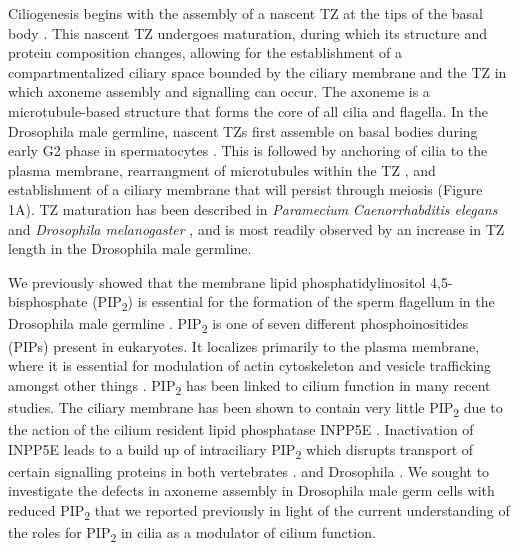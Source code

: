 \documentclass[12pt, twoside, letterpaper]{article}
\newcommand{\PIP}{PIP\textsubscript{2}}
\begin{document}
\begin{doublespacing}
\begin{linenumbers}
    Ciliogenesis begins with the assembly of a nascent TZ at the tips of
    the basal body \citep{reiter2012base}.
    This nascent TZ undergoes maturation, during which its structure and protein
    composition changes, allowing for the
    establishment of a compartmentalized ciliary space bounded by the ciliary membrane
    and the TZ in which axoneme assembly and signalling can occur.
    The axoneme is a microtubule-based structure that forms the core of all cilia and flagella.
    In the Drosophila male germline, nascent TZs first assemble on basal bodies
    during early G2 phase in spermatocytes \citep{riparbelli2012assembly}.
    This is followed by anchoring of cilia to the plasma membrane,
    rearrangment of microtubules within the TZ \citep{gottardo2013cilium},
    and establishment of a
    ciliary membrane that will persist through meiosis
    \citep{riparbelli2012assembly} (Figure 1A).
    TZ maturation has been described in
    \textit{Paramecium} \citep{aubusson2015transition}
    \textit{Caenorrhabditis elegans} \citep{serwas2017centrioles} and
    \textit{Drosophila melanogaster} \citep{gottardo2013cilium},
    and is most readily observed by an increase in TZ length
    in the Drosophila male germline.

    We previously showed that the membrane lipid phosphatidylinositol 4,5-bisphosphate
    (\PIP{}) is essential for the formation of the sperm flagellum in the Drosophila
    male germline \citep{wei2008depletion, fabian2010phosphatidylinositol}.
    \PIP{} is one of seven different phosphoinositides (PIPs) present in eukaryotes.
    It localizes primarily to the plasma membrane, where it is essential for
    modulation of actin cytoskeleton and vesicle trafficking amongst other things
    \citep{balla2013phosphoinositides}.
    \PIP{} has been linked to cilium function in many recent studies.
    The ciliary membrane has been shown to contain very little \PIP{} due to the action
    of the cilium resident lipid phosphatase INPP5E \citep{nakatsu2015phosphoinositide}.
    Inactivation of INPP5E leads to a build up of intraciliary \PIP{}
    which disrupts transport of certain signalling proteins in both vertebrates
    \citep{chavez2015modulation, garcia2015phosphoinositides, conduit2017compartmentalized}.
    and Drosophila \citep{park2015ciliary}.
    We sought to investigate the defects in axoneme assembly in Drosophila male germ cells
    with reduced \PIP{} 
    that we reported previously in light of the current understanding of the roles
    for \PIP{} in cilia as a modulator of cilium function.


\end{linenumbers}
\end{doublespacing}
\end{document}
